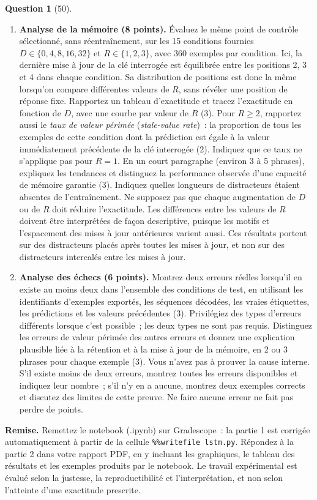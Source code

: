 \documentclass[12pt]{article}
\theoremstyle{definition}
\newtheorem{exercise}{Question}%
\begin{document}
\begin{exercise}[50]
{\begin{enumerate}
\item \textbf{Analyse de la mémoire (8 points).} Évaluez le même point de contrôle sélectionné, sans réentraînement,
sur les 15 conditions fournies $D\in\{0,4,8,16,32\}$ et $R\in\{1,2,3\}$, avec 360 exemples par condition. Ici, la
dernière mise à jour de la clé interrogée est équilibrée entre les positions 2, 3 et 4 dans chaque condition. Sa
distribution de positions est donc la même lorsqu'on compare différentes valeurs de $R$, sans révéler une position de
réponse fixe. Rapportez un tableau d'exactitude et tracez l'exactitude en fonction de $D$, avec une courbe par valeur
de $R$ (3). Pour $R\geq2$, rapportez aussi le \emph{taux de valeur périmée} (\emph{stale-value rate})~: la proportion
de tous les exemples de cette condition dont la prédiction est égale à la valeur immédiatement précédente de la clé
interrogée (2). Indiquez que ce taux ne s'applique pas pour $R=1$. En un court paragraphe (environ 3 à 5 phrases),
expliquez les tendances et distinguez la performance observée d'une capacité de mémoire garantie (3). Indiquez
quelles longueurs de distracteurs étaient absentes de l'entraînement. Ne supposez pas que chaque augmentation de $D$
ou de $R$ doit réduire l'exactitude. Les différences entre les valeurs de $R$ doivent être interprétées de façon
descriptive, puisque les motifs et l'espacement des mises à jour antérieures varient aussi. Ces résultats portent sur
des distracteurs placés après toutes les mises à jour, et non sur des distracteurs intercalés entre les mises à jour.

\item \textbf{Analyse des échecs (6 points).} Montrez deux erreurs réelles lorsqu'il en existe au moins deux dans
l'ensemble des conditions de test, en utilisant les identifiants d'exemples exportés, les séquences décodées, les
vraies étiquettes, les prédictions et les valeurs précédentes (3). Privilégiez des types d'erreurs différents lorsque
c'est possible~; les deux types ne sont pas requis. Distinguez les erreurs de valeur périmée des autres erreurs et
donnez une explication plausible liée à la rétention et à la mise à jour de la mémoire, en 2 ou 3 phrases pour chaque
exemple (3). Vous n'avez pas à prouver la cause interne. S'il existe moins de deux erreurs, montrez toutes les erreurs
disponibles et indiquez leur nombre~; s'il n'y en a aucune, montrez deux exemples corrects et discutez des limites de
cette preuve. Ne faire aucune erreur ne fait pas perdre de points.
\end{enumerate}

\textbf{Remise.} Remettez le notebook (.ipynb) sur Gradescope~: la partie 1 est corrigée automatiquement à partir de
la cellule \texttt{\%\%writefile lstm.py}. Répondez à la partie 2 dans votre rapport PDF, en y incluant les
graphiques, le tableau des résultats et les exemples produits par le notebook.
Le travail expérimental est évalué selon la justesse, la reproductibilité et l'interprétation, et non selon l'atteinte
d'une exactitude prescrite.
}
\end{exercise}
\end{document}
